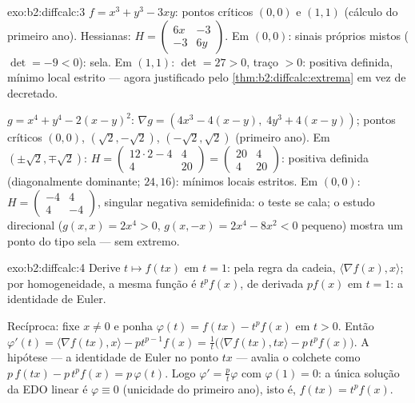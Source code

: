 \begin{solution}{exo:b2:diffcalc:3}
$f = x^3 + y^3 - 3xy$: pontos críticos $(0,0)$ e $(1,1)$ (cálculo do primeiro
ano). Hessianas: $H = \begin{pmatrix} 6x & -3\\ -3 &
6y\end{pmatrix}$. Em $(0,0)$: sinais próprios mistos ($\det = -9 < 0$):
sela. Em $(1,1)$: $\det = 27 > 0$, traço $> 0$: positiva
definida, mínimo local estrito --- agora justificado pelo
\cref{thm:b2:diffcalc:extrema} em vez de decretado.

$g = x^4 + y^4 - 2(x-y)^2$: $\nabla g = (4x^3 - 4(x - y),\; 4y^3 +
4(x-y))$; pontos críticos $(0,0)$, $(\sqrt2, -\sqrt2)$,
$(-\sqrt2, \sqrt2)$ (primeiro ano). Em $(\pm\sqrt2, \mp\sqrt2)$: $H =
\begin{pmatrix} 12\cdot2 - 4 & 4\\ 4 & 20\end{pmatrix} =
\begin{pmatrix} 20 & 4\\ 4 & 20\end{pmatrix}$: positiva definida
(diagonalmente dominante;  $24, 16$): mínimos locais estritos.
Em $(0,0)$: $H = \begin{pmatrix} -4 & 4\\ 4 & -4\end{pmatrix}$,
singular negativa semidefinida: o teste se cala; o estudo
direcional ($g(x,x) = 2x^4 > 0$, $g(x,-x) = 2x^4 - 8x^2 < 0$ pequeno)
mostra um ponto do tipo sela --- sem extremo.
\end{solution}

\begin{solution}{exo:b2:diffcalc:4}
Derive $t \mapsto f(tx)$ em $t = 1$: pela regra da cadeia,
$\langle \nabla f(x), x\rangle$; por homogeneidade, a mesma função
é $t^pf(x)$, de derivada $pf(x)$ em $t = 1$: a identidade de Euler.

Recíproca: fixe $x \neq 0$ e ponha $\varphi(t) = f(tx) - t^p f(x)$
em $t > 0$. Então $\varphi'(t) = \langle\nabla f(tx), x\rangle -
pt^{p-1}f(x) = \frac1t\bigl(\langle \nabla f(tx), tx\rangle -
p\,t^pf(x)\bigr)$. A hipótese --- a identidade de Euler no ponto
$tx$ --- avalia o colchete como $p\,f(tx) - p\,t^pf(x) =
p\,\varphi(t)$. Logo $\varphi' = \frac{p}{t}\varphi$ com $\varphi(1)
= 0$: a única solução da EDO linear é $\varphi \equiv 0$ (unicidade do
primeiro ano), isto é, $f(tx) = t^pf(x)$.
\end{solution}

